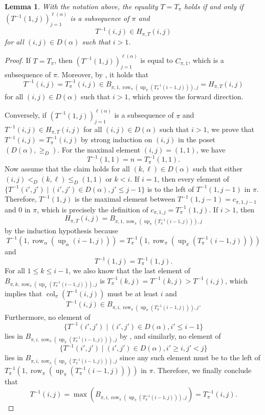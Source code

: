 \documentclass[10pt,a4paper]{amsart}
\newtheorem{lemma}{Lemma}
\DeclareMathOperator{\col}{col}
\DeclareMathOperator{\row}{row}
\DeclareMathOperator{\upof}{up}
\begin{document}
\begin{lemma}\label{lem:crux}
With the notation above, the equality $T=T_{\pi}$ holds if and only if $(T^{-1}(1,j))_{j=1}^{\ell(\alpha)}$ is a subsequence of $\pi$ and
\[T^{-1}(i,j)\in H_{\pi,T}(i,j)\]
for all $(i,j)\in D(\alpha)$ such that $i>1$.
\end{lemma}

\begin{proof}
If $T=T_{\pi}$, then $(T^{-1}(1,j))_{j=1}^{\ell(\alpha)}$ is equal to $C_{\pi,1}$, which is a subsequence of $\pi$. Moreover, by , it holds that
\[T^{-1}(i,j) = T^{-1}_{\pi}(i,j)\in B_{\pi,1,\row_{\pi}(\upof_{\pi}(T_{\pi}^{-1}(i-1,j))),j}=H_{\pi,T}(i,j)\]
for all $(i,j)\in D(\alpha)$ such that $i>1$, which proves the forward direction.

Conversely, if $(T^{-1}(1,j))_{j=1}^{\ell(\alpha)}$ is a subsequence of $\pi$ and $T^{-1}(i,j)\in H_{\pi,T}(i,j)$ for all $(i,j)\in D(\alpha)$ such that $i>1$, we prove that $T^{-1}(i,j)=T^{-1}_{\pi}(i,j)$ by strong induction on $(i,j)$ in the poset $(D(\alpha),\ge_{D})$. For the maximal element $(i,j)=(1,1)$, we have
\[T^{-1}(1,1)=n=T_{\pi}^{-1}(1,1).\]
Now assume that the claim holds for all $(k,\ell)\in D(\alpha)$ such that either $(i,j)<_{D}(k,\ell)\le_{D}(1,1)$ or $k<i$. If $i=1$, then every element of $\{T^{-1}(i',j')\mid (i',j')\in D(\alpha), j'\le j-1\}$ is to the left of $T^{-1}(1,j-1)$ in $\pi$. Therefore, $T^{-1}(1,j)$ is the maximal element between $T^{-1}(1,j-1)=c_{\pi,1,j-1}$ and $0$ in $\pi$, which is precisely the definition of $c_{\pi,1,j}=T_{\pi}^{-1}(1,j)$. If $i>1$, then 
\[H_{\pi,T}(i,j)=B_{\pi,1,\row_{\pi}(\upof_{\pi}(T_{\pi}^{-1}(i-1,j))),j}\]
by the induction hypothesis because
\[T^{-1}(1,\row_{\alpha}(\upof_{\alpha}(i-1,j)))=T^{-1}_{\pi}(1,\row_{\pi}(\upof_{\pi}(T_{\pi}^{-1}(i-1,j))))\]
and
\[T^{-1}(1,j)=T^{-1}_{\pi}(1,j).\]
For all $1\le k\le i-1$, we also know that the last element of $B_{\pi,k,\row_{\pi}(\upof_{\pi}(T^{-1}_{\pi}(i-1,j))),j}$ is $T_{\pi}^{-1}(k,j)=T^{-1}(k,j)>T^{-1}(i,j)$, which implies that $\col_{\pi}(T^{-1}(i,j))$ must be at least $i$ and
\[T^{-1}(i,j)\in B_{\pi,i,\row_{\pi}(\upof_{\pi}(T^{-1}_{\pi}(i-1,j))),j}.\] Furthermore, no element of 
\[\{T^{-1}(i',j')\mid (i',j')\in D(\alpha), i'\le i-1\}\]
lies in $B_{\pi,i,\row_{\pi}(\upof_{\pi}(T^{-1}_{\pi}(i-1,j))),j}$ by , and similarly, no element of 
\[\{T^{-1}(i',j')\mid (i',j')\in D(\alpha), i'\ge i, j'<j\}\]
lies in $B_{\pi,i,\row_{\pi}(\upof_{\pi}(T^{-1}_{\pi}(i-1,j))),j}$ since any such element must be to the left of $T^{-1}_{\pi}(1,\row_{\pi}(\upof_{\pi}(T^{-1}_{\pi}(i-1,j))))$ in $\pi$. Therefore, we finally conclude that
\[T^{-1}(i,j)=\max(B_{\pi,i,\row_{\pi}(\upof_{\pi}(T^{-1}_{\pi}(i-1,j))),j})=T^{-1}_{\pi}(i,j).\]
\end{proof}
\end{document}
